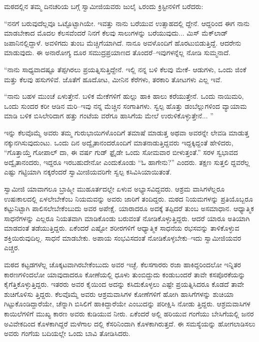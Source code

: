 ಮಠದಲ್ಲಿನ ತಮ್ಮ ದಿನಚರಿಯ ಬಗ್ಗೆ ಸ್ವಾಮೀಜಿಯವರು ಜುಲೈ ೬ರಂದು ಕ್ರಿಸ್ಟೀನಳಿಗೆ ಬರೆದರು:

“ನನಗೆ ಬರುವುದೆಲ್ಲವೂ ಒಟ್ಟೊಟ್ಟಾಗಿಯೇ. ಇವತ್ತು ನಾನು ಬರೆಯುವ ಉತ್ಸಾಹದಲ್ಲಿ ದ್ದೇನೆ. ಆದ್ದರಿಂದ ಈಗ ನಾನು ಮಾಡಬೇಕಾದ ಮೊದಲ ಕೆಲಸವೆಂದರೆ ನಿನಗೆ ಕೆಲವು ಸಾಲುಗಳನ್ನು ಬರೆಯುವುದು... ಮಿಸ್ ಮೆಕ್​ಲಾಡ್ ಜಪಾನಿನಲ್ಲಿದ್ದಾಳೆ. ಅವಳಿಗದು ತುಂಬ ಮೆಚ್ಚಿಗೆಯಾಗಿದೆ. ನಾನೂ ಅವಳೊಂದಿಗೆ ಹೊರಟುಬಿಡುತ್ತಿದ್ದೆ. ಆದರೇನು ಮಾಡುವುದು. ಈ ಅನಾರೋಗ್ಯ ದೂರ ಸಮುದ್ರಪ್ರಯಾಣದ ತೊಂದರೆ–ಇವುಗಳನ್ನೆಲ್ಲ ನೋಡಿ ಸುಮ್ಮನಾದೆ.

“ನಾನು ಸಾಧ್ಯವಾದಷ್ಟೂ ತೆಪ್ಪಗಿರಲು ಪ್ರಯತ್ನಿಸುತ್ತಿದ್ದೇನೆ. ಇಲ್ಲಿ ನನ್ನ ಬಳಿ ಕೆಲವು ಮೇಕೆ- ಆಡುಗಳು, ಒಂದು ಜಿಂಕೆ ಮತ್ತು ಕೆಲವು ಹಸುಗಳಿವೆ. ಜೊತೆಗೆ ಹೂದೋಟ, ಮೀನಿನ ಕೆರೆಗಳು, ತರಕಾರಿ ತೋಟಗಳು ಎಲ್ಲ ಇವೆ.

“ನಾನು ಬಹಳ ಮುಂಚೆ ಏಳುತ್ತೇನೆ. ಬಳಿಕ ಮೇಕೆಗಳಿಗೆ ಹುಲ್ಲು ಹಾಕಿ ಹಾಲು ಕರೆಯುತ್ತೇನೆ. ಒಂದು ನಾಯಿಮರಿ, ಒಂದು ಸುಂದರ ಕರೀ ಆಡಿನ ಮರಿ–ಇವು ನನ್ನ ಮೆಚ್ಚಿನ ಸಂಗಾತಿಗಳು. ಸ್ವಲ್ಪ ಹೊತ್ತು ಡಂಬೆಲ್ಲುಗಳಿಂದ ವ್ಯಾಯಾಮ ಮಾಡಿ ಬಳಿಕ ಬಿಸಿಲೇರಿದಾಗ ಹತ್ತು ಗಂಟೆಯ ವರೆಗೂ ಹಾಸಿಗೆಯ ಮೇಲೆ ಉರುಳಿಕೊಳ್ಳುತ್ತೇನೆ... ”

ಇನ್ನು ಕೆಲವೊಮ್ಮೆ ಅವರು ತಮ್ಮ ಗುರುಭಾಯಿಗಳೊಂದಿಗೆ ತಮಾಷೆ ಮಾಡುತ್ತ ಅಥವಾ ಅವರನ್ನೇ ಲೇವಡಿ ಮಾಡುತ್ತ ನಕ್ಕುನಗಿಸುವುದುಂಟು. ಒಂದು ದಿನ ಅದ್ವೈತಾನಂದರೊಂದಿಗೆ ಮಾತನಾಡುತ್ತಿದ್ದವರು ಇದ್ದಕ್ಕಿದ್ದಂತೆ ಹೇಳಿದರು, “ಗೊತ್ತಾಯ್ತೆ ಗೋಪಾಲ್ ದಾ, ಈ ವರ್ಷ ಗುಡ್ ಫ್ರೈಡೇ ಒಂದು ಸೋಮವಾರ ಬೀಳುತ್ತಂತೆ.” ಸರಳ ಸ್ವಭಾವದ ಅದ್ವೈತಾನಂದರು, ಇದ್ದರೂ ಇರಬಹುದೇನೋ ಎಂದುಕೊಂಡು “ಓ ಹಾಗೇನು?” ಎಂದರು. ತಕ್ಷಣ ಸುತ್ತಲಿ ದ್ದವರೆಲ್ಲ ಎಷ್ಟು ಗಟ್ಟಿಯಾಗಿ ನಕ್ಕರೆಂದರೆ ಸ್ವಾಮೀಜಿಯವರಿಗೇ ಸ್ವಲ್ಪ ಕಸಿವಿಸಿಯಾಯಿತಂತೆ.

ಸ್ವಾಮೀಜಿ ಯಾವಾಗಲೂ ಬ್ರಾಹ್ಮೀ ಮುಹೂರ್ತದಲ್ಲೇ ಏಳುವ ಅಭ್ಯಾಸವಿದ್ದವರು. ಆಶ್ರಮ ವಾಸಿಗಳೆಲ್ಲರೂ ಉಷಃಕಾಲದಲ್ಲಿ ಏಳಲೇಬೇಕೆಂಬ ನಿಯಮವನ್ನು ಅವರು ಜಾರಿಗೆ ತಂದಿದ್ದರು. ಮಠದ ನಿಯಮಗಳನ್ನು ಪ್ರತಿಯೊಬ್ಬರೂ ಕಟ್ಟುನಿಟ್ಟಾಗಿ ಪಾಲಿಸಲೇಬೇಕೆಂಬುದು ಅವರ ಅಪೇಕ್ಷೆ. ಯಾರಾದರೂ ಅದಕ್ಕೆ ತಪ್ಪಿದರೆ ತುಂಬ ಅಸಮಾಧಾನ. ಆಧ್ಯಾತ್ಮಿಕ ಸಾಧನೆಗಳನ್ನು ಎಲ್ಲರೂ ನಿಯತವಾಗಿ ಮಾಡಿಕೊಂಡು ಬರುವಂತೆ ನೋಡಿಕೊಳ್ಳುತ್ತಿದ್ದರು. ಆದರೆ ಯಾರೂ ಅತಿಯಾಗಿ ಮಾಡದಂತೆ ತಡೆಯುತ್ತಿದ್ದರು. ಏಕೆಂದರೆ ಎಷ್ಟೋ ಶರೀರಗಳಿಗೆ ಆಧ್ಯಾತ್ಮಿಕ ಸಾಧನೆಯ ರಭಸವನ್ನು ತಾಳಿಕೊಳ್ಳುವ ಶಕ್ತಿಯಿರುವುದಿಲ್ಲ. ಸಾಧನೆ ಮಾಡಬೇಕು. ಅಪಾಯ ಸಂಭವಿಸದಂತೆ ನೋಡಿಕೊಳ್ಳಬೇಕು–ಇದು ಸ್ವಾಮೀಜಿಯವರ ಎಚ್ಚರ.

ಮಠದ ಕಟ್ಟಡಗಳೆಲ್ಲ ಚೊಕ್ಕಟವಾಗಿರಬೇಕೆಂಬುದು ಅವರ ಇಚ್ಛೆ. ಕೆಲಸಗಾರರು ರಜಾ ಹಾಕಿದ್ದರಿಂದಲೋ ಇನ್ನಿತರ ಕಾರಣಗಳಿಂದಲೋ ಯಾವುದಾದರೂ ಕೋಣೆಯಲ್ಲಿ ಧೂಳು ತುಂಬಿದ್ದುದು ಕಂಡುಬಂದರೆ ತಾವೇ ಕಸಪೊರಕೆಯನ್ನು ಕೈಗೆತ್ತಿಕೊಳ್ಳುತ್ತಿದ್ದರು. ಇತರರು ಅವರ ಕೈಯಿಂದ ಅದನ್ನು ಕಸಿದುಕೊಳ್ಳಲು ಎಷ್ಟೇ ಪ್ರಯತ್ನಿಸಿದರೂ ಕೊಡದೆ ತಾವೇ ಶುಚಿಗೊಳಿಸು ತ್ತಿದ್ದರು. ಕೆಲವೊಮ್ಮೆ ಅವರು ಆಶ್ರಮವಾಸಿಗಳ ಕೋಣೆಗಳಿಗೆ ಹೋಗಿ ಹಾಸಿಗೆಗಳನ್ನು ಶುಚಿಯಾ ಗಿಟ್ಟುಕೊಂಡಿದ್ದಾರೆಯೇ, ಚೆನ್ನಾಗಿ ಬಿಸಿಲಿಗೆ ಹಾಕಿದ್ದಾರೆಯೇ ಎಂಬುದನ್ನು ಪರೀಕ್ಷಿಸಿ ನೋಡು ತ್ತಿದ್ದರು. ಆಶ್ರಮವಾಸಿಗಳ ಕಾಯಿಲೆಗಳಿಗೆ ಮುಖ್ಯ ಕಾರಣ ಅವರು ಕುಡಿಯುವ ನೀರು. ಏಕೆಂದರೆ ಅಲ್ಲಿ ಹರಿಯುವ ಗಂಗೆಯು ಬೇಸಿಗೆಯಲ್ಲಿ ಜನರ ಅವಿವೇಕದಿಂದ ಕೊಳಕಾಗಿದ್ದರೆ ಮಳೆಗಾಲ ದಲ್ಲಿ ಕೆಸರಿನಿಂದಾಗಿ ಕೊಳಕಾಗಿರುತ್ತದೆ. ಈ ಸಮಸ್ಯೆಯನ್ನು ಹೋಗಲಾಡಿಸಲು ಅವರು ಗಂಗೆಯ ಬದಿಯಲ್ಲೇ ಒಂದು ಬಾವಿ ತೋಡಿಸಿದರು.

